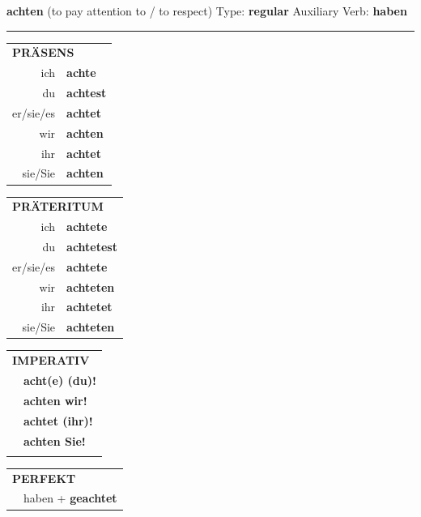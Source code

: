 \documentclass[10pt,a4paper]{revtex4-2}
\begin{document}
\begin{verbbox}
    {\Large \bf achten} (to pay attention to / to respect) \hfill Type: \textbf{regular} \hfill Auxiliary Verb: \textbf{haben} 
    
     \vspace{5pt}

    \hrule
    
    \vspace{5pt}

  \begin{tabular}{rl}
     \multicolumn{2}{l}{\textbf{PRÄSENS} }\\
    ich & \textbf{achte}\\
    du & \textbf{achtest}\\
    er/sie/es & \textbf{achtet}\\
    wir & \textbf{achten}\\
    ihr & \textbf{achtet}\\
    sie/Sie & \textbf{achten}\\
  \end{tabular}
  \hfill
     \begin{tabular}{rl}
    \multicolumn{2}{l}{\textbf{PRÄTERITUM} }\\
    ich & \textbf{achtete}\\
    du & \textbf{achtetest}\\
    er/sie/es & \textbf{achtete}\\
    wir & \textbf{achteten}\\
    ihr & \textbf{achtetet}\\
    sie/Sie & \textbf{achteten}\\
  \end{tabular}
  \hfill
  \begin{tabular}{rl}
     \multicolumn{2}{l}{\textbf{IMPERATIV} }\\
   & \textbf{acht(e) (du)!}\\
   & \textbf{achten wir!}\\
   & \textbf{achtet (ihr)!}\\
   & \textbf{achten Sie!}\\
   & \vspace{10pt}
  \end{tabular}

    \vspace{10pt}

 \begin{tabular}{rl}
     \multicolumn{2}{l}{\textbf{PERFEKT}}\\
   & haben + \textbf{geachtet}\\
  \end{tabular}
\hfill
   \begin{tabular}{rl}
   

\end{tabular}
\end{verbbox}
\end{document}
